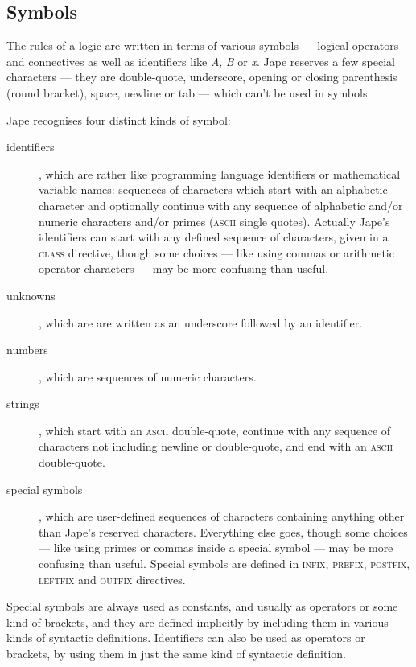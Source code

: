 \subsection{Symbols}

The rules of a logic are written in terms of various symbols --- logical operators and connectives as well as identifiers like \textit{A}, \textit{B} or \textit{x}. Jape reserves a few special characters --- they are double-quote, underscore, opening or closing parenthesis (round bracket), space, newline or tab --- which can't be used in symbols.

Jape recognises four distinct kinds of symbol:

\begin{description}
\item[identifiers], which are rather like programming language identifiers or mathematical variable names: sequences of characters which start with an alphabetic character and optionally continue with any sequence of alphabetic and/or numeric characters and/or primes (\textsc{ascii} single quotes). Actually Jape's identifiers can start with any defined sequence of characters, given in a \textsc{class} directive, though some choices --- like using commas or arithmetic operator characters --- may be more confusing than useful.

\item[unknowns], which are are written as an underscore followed by an identifier.

\item[numbers], which are sequences of numeric characters.

\item[strings], which start with an \textsc{ascii} double-quote, continue with any sequence of characters not including newline or double-quote, and end with an \textsc{ascii} double-quote.

\item[special symbols], which are user-defined sequences of characters containing anything other than Jape's reserved characters. Everything else goes, though some choices --- like using primes or commas inside a special symbol --- may be more confusing than useful. Special symbols are defined in \textsc{infix, prefix, postfix, leftfix} and \textsc{outfix} directives.
\end{description}

Special symbols are always used as constants, and usually as operators or some kind of brackets, and they are defined implicitly by including them in various kinds of syntactic definitions. Identifiers can also be used as operators or brackets, by using them in just the same kind of syntactic definition.

